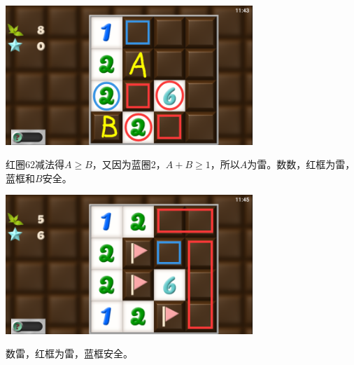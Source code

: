 \subsection{} %
\begin{center}
    \includegraphics[width=0.7\textwidth]{puzzle/131-1.png}
\end{center}
红圈62减法得$A\ge B$，又因为蓝圈2，$A+B\ge 1$，所以$A$为雷。数数，红框为雷，蓝框和$B$安全。
\begin{center}
    \includegraphics[width=0.7\textwidth]{puzzle/131-2.png}
\end{center}
数雷，红框为雷，蓝框安全。

